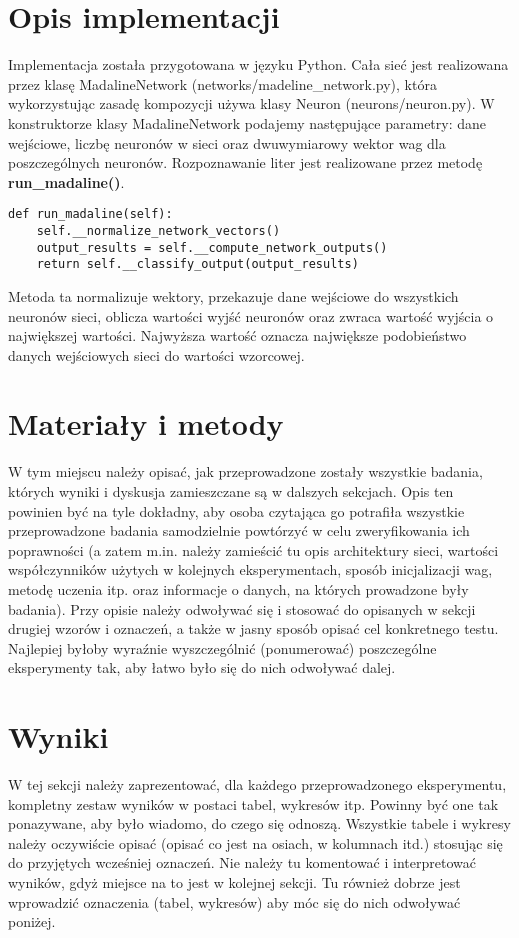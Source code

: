 \documentclass{classrep}
\begin{document}
\section{Opis implementacji}
{Implementacja została przygotowana w języku Python. Cała sieć jest realizowana przez klasę MadalineNetwork (networks\slash madeline{\_}network.py), która wykorzystując zasadę kompozycji używa klasy Neuron (neurons/neuron.py). W konstruktorze klasy MadalineNetwork podajemy następujące parametry:
dane wejściowe, liczbę neuronów w sieci oraz dwuwymiarowy wektor wag dla poszczególnych neuronów.
Rozpoznawanie liter jest realizowane przez metodę \textbf{run{\_}madaline()}. 
\begin{lstlisting}
def run_madaline(self):
	self.__normalize_network_vectors()
	output_results = self.__compute_network_outputs()
	return self.__classify_output(output_results)
\end{lstlisting}
Metoda ta normalizuje wektory, przekazuje dane wejściowe do wszystkich neuronów sieci, oblicza wartości wyjść neuronów oraz zwraca wartość wyjścia o największej wartości. Najwyższa wartość oznacza największe podobieństwo danych wejściowych sieci do wartości wzorcowej.}

\section{Materiały i metody}
{\color{blue}
W tym miejscu należy opisać, jak przeprowadzone zostały wszystkie badania,
których wyniki i dyskusja zamieszczane są w dalszych sekcjach. Opis ten
powinien być na tyle dokładny, aby osoba czytająca go potrafiła wszystkie
przeprowadzone badania samodzielnie powtórzyć w celu zweryfikowania ich
poprawności (a zatem m.in. należy zamieścić tu opis architektury sieci,
wartości współczynników użytych w kolejnych eksperymentach, sposób
inicjalizacji wag, metodę uczenia itp. oraz informacje o danych, na których
prowadzone były badania). Przy opisie należy odwoływać się i stosować do
opisanych w sekcji drugiej wzorów i oznaczeń, a także w jasny sposób opisać
cel konkretnego testu. Najlepiej byłoby wyraźnie wyszczególnić (ponumerować)
poszczególne eksperymenty tak, aby łatwo było się do nich odwoływać dalej.}

\section{Wyniki}
{\color{blue}
W tej sekcji należy zaprezentować, dla każdego przeprowadzonego eksperymentu,
kompletny zestaw wyników w postaci tabel, wykresów itp. Powinny być one tak
ponazywane, aby było wiadomo, do czego się odnoszą. Wszystkie tabele i wykresy
należy oczywiście opisać (opisać co jest na osiach, w kolumnach itd.) stosując
się do przyjętych wcześniej oznaczeń. Nie należy tu komentować i interpretować
wyników, gdyż miejsce na to jest w kolejnej sekcji. Tu również dobrze jest
wprowadzić oznaczenia (tabel, wykresów) aby móc się do nich odwoływać
poniżej.}
\end{document}
